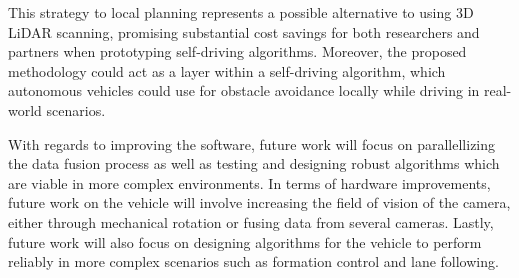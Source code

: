 \documentclass[conference]{IEEEtran}
\begin{document}
This strategy to local planning represents a possible alternative to using 3D LiDAR scanning, promising substantial cost savings for both researchers and partners when prototyping self-driving algorithms. Moreover, the proposed methodology could act as a layer within a self-driving algorithm, which autonomous vehicles could use for obstacle avoidance locally while driving in real-world scenarios. 

With regards to improving the software, future work will focus on parallellizing the data fusion process as well as testing and designing robust algorithms which are viable in more complex environments. In terms of hardware improvements, future work on the vehicle will involve increasing the field of vision of the camera, either through mechanical rotation or fusing data from several cameras. Lastly, future work will also focus on designing algorithms for the vehicle to perform reliably in more complex scenarios such as formation control and lane following. 


 



\end{document}
